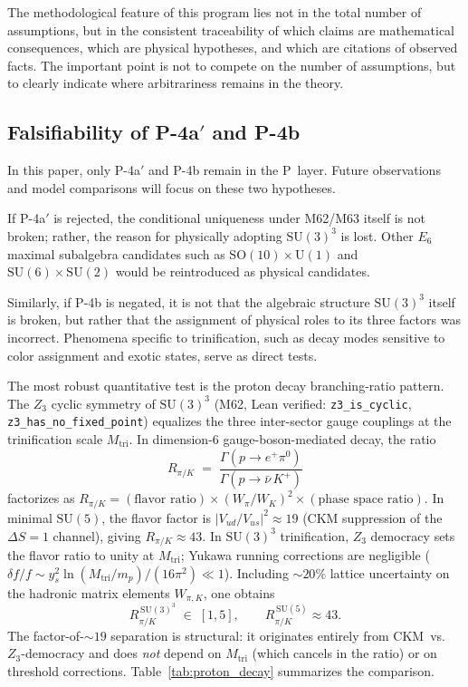 \documentclass[sn-mathphys-num,Numbered]{sn-jnl}
\theoremstyle{thmstyleone}
\theoremstyle{thmstylethree}
\newcommand{\SU}{\mathrm{SU}}
\newcommand{\SO}{\mathrm{SO}}
\newcommand{\U}{\mathrm{U}}
\begin{document}
The methodological feature of this program lies not in the total number of
assumptions, but in the consistent traceability of which claims are
mathematical consequences, which are physical hypotheses, and which are
citations of observed facts.  The important point is not to compete on the
number of assumptions, but to clearly indicate where arbitrariness remains in
the theory.


\subsection{Falsifiability of P-4a$'$ and P-4b}\label{sec:falsifiability}

In this paper, only P-4a$'$ and P-4b remain in the P~layer.  Future
observations and model comparisons will focus on these two hypotheses.

If P-4a$'$ is rejected, the conditional uniqueness under M62/M63 itself is not
broken; rather, the reason for physically adopting $\SU(3)^3$ is lost.  Other
$E_6$ maximal subalgebra candidates such as $\SO(10) \times \U(1)$ and $\SU(6)
\times \SU(2)$ would be reintroduced as physical candidates.

Similarly, if P-4b is negated, it is not that the algebraic structure
$\SU(3)^3$ itself is broken, but rather that the assignment of physical roles
to its three factors was incorrect.  Phenomena specific to trinification, such
as decay modes sensitive to color assignment and exotic states, serve as direct
tests.

The most robust quantitative test is the proton decay branching-ratio
pattern.  The $Z_3$ cyclic symmetry of $\SU(3)^3$ (M62, Lean verified:
\texttt{z3\_is\_cyclic}, \texttt{z3\_has\_no\_fixed\_point}) equalizes the
three inter-sector gauge couplings at the trinification scale $M_{\mathrm{tri}}$.
In dimension-6 gauge-boson-mediated decay, the ratio
\begin{equation}\label{eq:RpiK}
  R_{\pi/K}
  \;=\;
  \frac{\Gamma(p \to e^+ \pi^0)}
       {\Gamma(p \to \bar{\nu}\, K^+)}
\end{equation}
factorizes as
$R_{\pi/K} = (\text{flavor ratio})
  \times (W_\pi / W_K)^2
  \times (\text{phase space ratio})$.
In minimal $\SU(5)$, the flavor factor is $|V_{ud}/V_{us}|^2 \approx 19$
(CKM suppression of the $\Delta S = 1$ channel), giving $R_{\pi/K} \approx 43$.
In $\SU(3)^3$ trinification, $Z_3$ democracy sets the flavor ratio to unity
at $M_{\mathrm{tri}}$; Yukawa running corrections are negligible
($\delta f/f \sim y_s^2 \ln(M_{\mathrm{tri}}/m_p)/(16\pi^2) \ll 1$).
Including $\sim 20\%$ lattice uncertainty on the hadronic matrix elements
$W_{\pi,K}$, one obtains
\begin{equation}\label{eq:RpiK-value}
  R_{\pi/K}^{\,\SU(3)^3} \;\in\; [1, 5],
  \qquad
  R_{\pi/K}^{\,\SU(5)} \approx 43.
\end{equation}
The factor-of-$\sim 19$ separation is structural: it originates entirely from
CKM~vs.\ $Z_3$-democracy and does \emph{not} depend on $M_{\mathrm{tri}}$
(which cancels in the ratio) or on threshold corrections.
Table~\ref{tab:proton_decay} summarizes the comparison.
\end{document}

